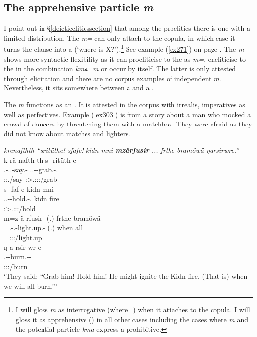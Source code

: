 \subsection{The apprehensive particle \emph{m}}\label{apprehensivem}

I point out in \S{}\ref{deicticcliticssection} that among the  proclitics there is one with a limited distribution. The \emph{m=}  can only attach to the copula, in which case it turns the clause into a  (`where is X?').\footnote{I will gloss \emph{m} as interrogative (where=) when it attaches to the copula. I will gloss it as apprehensive (\Appr) in all other cases including the cases where \emph{m} and the potential particle \emph{kma} express a prohibitive.} See example (\ref{ex271}) on page \pageref{ex271}. The \emph{m}  shows more syntactic flexibility as it can procliticise to the  as \emph{m=}, encliticise to the   in the combination \emph{kma=m} or occur by itself. The latter is only attested through elicitation and there are no corpus examples of independent \emph{m}. Nevertheless, it sits somewhere between a  and a .%

The  \emph{m} functions as an . It is attested in the corpus with irrealis, imperatives as well as perfectives. Example (\ref{ex303}) is from a story about a man who mocked a crowd of dancers by threatening them with a matchbox. They were afraid as they did not know about matches and lighters.

\begin{exe}
	\ex \emph{krenafthth ``sritüthe! sfafe! kidn mni \textbf{mzärfusir} ... frthe bramöwä ŋarsirwre.''}\\
	\glll k-rä-nafth-th s-\Zero{}-ritüth-e\\
	\M.\Bet-\Irr.\Vc.\Ndu-say.\Rs-\Stnsg{} \Tsg.\Masc.\Bet-\Du-grab.\Rs-\Stnsg{}.\Imp{}\\
	\footnotesize{\Stpl:\Sbj:\Irr.\Pfv/say} \footnotesize{\Sdu:\Sbj>\Tsg.\Masc:\Obj:\Imp:\Pfv/grab}\\
	\sn
	\glll s-\Zero{}-faf-e kidn mni\\
	\Tsg.\Masc.\Bet-\Du-hold.\Rs-\Stnsg{}.\Imp{} kidn fire\\
	\footnotesize{\Sdu:\Sbj>\Tsg.\Masc:\Obj:\Imp:\Pfv/hold} {} {}\\
	\sn
	\glll m=z-ä-rfusir-\Zero{} (.) frthe bramöwä\\
	\Appr=\M.\Gam-\Vc.\Ndu-light.up.\Rs{}-\Stsg{} (.) when all\\
	\footnotesize{\Appr=\Stsg:\Sbj:\Rpst:\Pfv/light.up} {} {} {}\\
	\sn
	\glll ŋ-a-rsir-wr-e\\
	\M.\Alph-\Vc-burn.\Ext-\Ndu-\Fnsg{}\\
	\footnotesize{\Fpl:\Sbj:\Nonpast:\Ipfv/burn}\\
	\trans `They said: ``Grab him! Hold him! He might ignite the Kidn fire. (That is) when we will all burn.''' 
	\label{ex303}
\end{exe}

